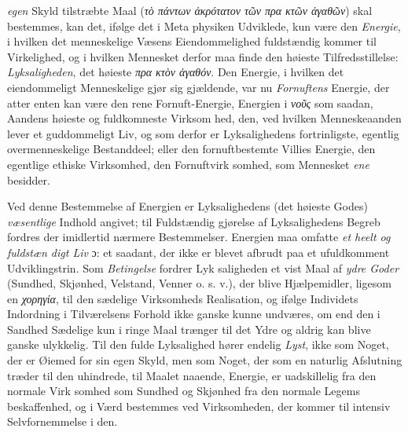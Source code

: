 \documentclass[12pt,a4paper]{book}
\newcommand{\gk}[1]{\textit{#1}}
\begin{document}
\emph{egen} Skyld tilstræbte Maal (\gk{τὸ πάντων ἀκρότατον τῶν πρα\-%
κτῶν ἀγαθῶν}) skal bestemmes, kan det, ifølge det i Meta\-%
physiken Udviklede, kun være den \emph{Energie}, i hvilken det
menneskelige Væsens Eiendommelighed fuldstændig kommer
til Virkelighed, og i hvilken Mennesket derfor maa finde den
høieste Tilfredsstillelse: \emph{Lyksaligheden}, det høieste \gk{πρα\-%
κτὸν ἀγαθόν}. Den Energie, i hvilken det eiendommeligt
Menneskelige gjør sig gjældende, var nu \emph{Fornuftens} Energie,
der atter enten kan være den rene Fornuft-Energie, Energien
i \gk{νοῦς} som saadan, Aandens høieste og fuldkomneste Virksom\-%
hed, den, ved hvilken Menneskeaanden lever et guddommeligt
Liv, og som derfor er Lyksalighedens fortrinligste, egentlig
overmenneskelige Bestanddeel; eller den fornuftbestemte Villies
Energie, den egentlige ethiske Virksomhed, den Fornuftvirk\-%
somhed, som Mennesket \emph{ene} besidder.

Ved denne Bestemmelse af Energien er Lyksalighedens (det
høieste Godes) \emph{væsentlige} Indhold angivet; til Fuldstændig\-%
gjørelse af Lyksalighedens Begreb fordres der imidlertid nærmere
Bestemmelser. Energien maa omfatte \emph{et heelt og fuldstæn\-%
digt Liv} ɔ: et saadant, der ikke er blevet afbrudt paa et
ufuldkomment Udviklingstrin. Som \emph{Betingelse} fordrer Lyk\-%
saligheden et vist Maal af \emph{ydre Goder} (Sundhed, Skjønhed,
Velstand, Venner o. s. v.), der blive Hjælpemidler, ligesom en
\gk{χορηγία}, til den sædelige Virksomheds Realisation, og ifølge
Individets Indordning i Tilværelsens Forhold ikke ganske kunne
undværes, om end den i Sandhed Sædelige kun i ringe Maal
trænger til det Ydre og aldrig kan blive ganske ulykkelig.
Til den fulde Lyksalighed hører endelig \emph{Lyst}, ikke som
Noget, der er Øiemed for sin egen Skyld, men som Noget,
der som en naturlig Afslutning træder til den uhindrede, til
Maalet naaende, Energie, er uadskillelig fra den normale Virk\-%
somhed som Sundhed og Skjønhed fra den normale Legems\-%
beskaffenhed, og i Værd bestemmes ved Virksomheden, der
kommer til intensiv Selvfornemmelse i den.
\end{document}
